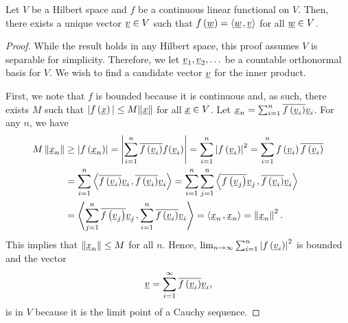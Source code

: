 \begin{theorem}[Riesz] \label{theorem:FunctionalInnerProduct}
Let $V$ be a Hilbert space and $f$ be a continuous linear functional on $V$.
Then, there exists a unique vector $\underline{v} \in V$ such that $f \left( \underline{w} \right) = {\left\langle  \underline{w}  \mskip2mu ,  \underline{v}  \right\rangle}$ for all $\underline{w} \in V$.
\end{theorem}
\begin{proof}
While the result holds in any Hilbert space, this proof assumes $V$ is separable for simplicity.
Therefore, we let $\underline{v}_1, \underline{v}_2, \ldots$ be a countable orthonormal basis for $V$.
We wish to find a candidate vector $\underline{v}$ for the inner product.

First, we note that $f$ is bounded because it is continuous and, as such, there exists $M$ such that $| f \left( \underline{x} \right) | \leq M \| \underline{x} \|$ for all $\underline{x} \in V$.
Let $\underline{x}_n = \sum_{i=1}^n \overline{ f \left( \underline{v}_i \right) } \underline{v}_i$.
For any $n$, we have
\begin{equation*}
\begin{split}
M \left\| \underline{x}_n \right\| &\geq \left| f \left( \underline{x}_n \right) \right|
= \left| \sum_{i=1}^n \overline{ f \left( \underline{v}_i \right) } f(\underline{v}_i) \right|
= \sum_{i=1}^n \left| f \left( \underline{v}_i \right) \right|^2
= \sum_{i=1}^n f \left( \underline{v}_i \right)
\overline{ f \left( \underline{v}_i \right) } \\
&= \sum_{i=1}^n {\left\langle  \overline{ f \left( \underline{v}_i \right) } \underline{v}_i  \mskip2mu ,  \overline{ f \left( \underline{v}_i \right) } \underline{v}_i  \right\rangle}
= \sum_{i=1}^n \sum_{j=1}^n
{\left\langle  \overline{ f \left( \underline{v}_j \right) } \underline{v}_j  \mskip2mu ,  \overline{ f \left( \underline{v}_i \right) } \underline{v}_i  \right\rangle} \\
&= {\left\langle  \sum_{j=1}^n \overline{ f \left( \underline{v}_j \right) } \underline{v}_j  \mskip2mu ,  \sum_{i=1}^n \overline{ f \left( \underline{v}_i \right) } \underline{v}_i  \right\rangle}
= {\left\langle  \underline{x}_n  \mskip2mu ,  \underline{x}_n  \right\rangle}
= \left\| \underline{x}_n \right\|^2 .
\end{split}
\end{equation*}
This implies that $\| \underline{x}_n \| \leq M$ for all $n$.
Hence, $\lim_{n \rightarrow \infty} \sum_{i=1}^n \left| f \left( \underline{v}_i \right) \right|^2$ is bounded and the vector
\begin{equation*}
\underline{v} = \sum_{i=1}^{\infty} \overline{ f \left( \underline{v}_i \right) } \underline{v}_i ,
\end{equation*}
is in $V$ because it is the limit point of a Cauchy sequence.

\end{proof}
